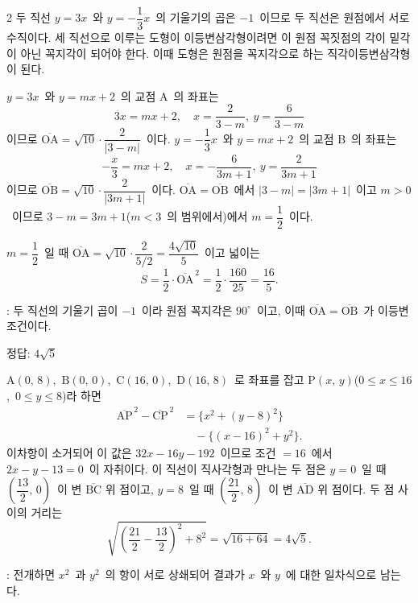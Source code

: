 \documentclass[10pt,fleqn]{article}
\begin{document}
\begin{multicols*}{2}
두 직선 $y = 3x$\ 와 $y = -\dfrac{1}{3}x$\ 의 기울기의 곱은 $-1$\ 이므로 두 직선은 원점에서 서로 수직이다. 세 직선으로 이루는 도형이 이등변삼각형이려면 이 원점 꼭짓점의 각이 밑각이 아닌 꼭지각이 되어야 한다. 이때 도형은 원점을 꼭지각으로 하는 직각이등변삼각형이 된다.

$y = 3x$\ 와 $y = mx + 2$\ 의 교점 $\mathrm{A}$\ 의 좌표는
\[ 3x = mx + 2,\quad x = \dfrac{2}{3 - m},\ y = \dfrac{6}{3 - m} \]
이므로 $\overline{\mathrm{OA}} = \sqrt{10} \cdot \dfrac{2}{|3 - m|}$\ 이다. $y = -\dfrac{1}{3}x$\ 와 $y = mx + 2$\ 의 교점 $\mathrm{B}$\ 의 좌표는
\[ -\dfrac{x}{3} = mx + 2,\quad x = -\dfrac{6}{3m + 1},\ y = \dfrac{2}{3m + 1} \]
이므로 $\overline{\mathrm{OB}} = \sqrt{10} \cdot \dfrac{2}{|3m + 1|}$\ 이다. $\overline{\mathrm{OA}} = \overline{\mathrm{OB}}$\ 에서 $|3 - m| = |3m + 1|$\ 이고 $m > 0$\ 이므로 $3 - m = 3m + 1$($m < 3$\ 의 범위에서)에서 $m = \dfrac{1}{2}$\ 이다.

$m = \dfrac{1}{2}$\ 일 때 $\overline{\mathrm{OA}} = \sqrt{10} \cdot \dfrac{2}{5/2} = \dfrac{4\sqrt{10}}{5}$\ 이고 넓이는
\[ S = \dfrac{1}{2} \cdot \overline{\mathrm{OA}}^{\,2} = \dfrac{1}{2} \cdot \dfrac{160}{25} = \dfrac{16}{5}. \]

\begin{dmcriticalpoint}
: 두 직선의 기울기 곱이 $-1$\ 이라 원점 꼭지각은 $90^{\circ}$\ 이고, 이때 $\overline{\mathrm{OA}} = \overline{\mathrm{OB}}$\ 가 이등변 조건이다.
\end{dmcriticalpoint}

\begin{dmanswerbox}
정답: $4\sqrt{5}$
\end{dmanswerbox}

$\mathrm{A}(0,\, 8)$,\ $\mathrm{B}(0,\, 0)$,\ $\mathrm{C}(16,\, 0)$,\ $\mathrm{D}(16,\, 8)$\ 로 좌표를 잡고 $\mathrm{P}(x,\, y)$($0 \le x \le 16$,\ $0 \le y \le 8$)라 하면
\begin{align*}
  \overline{\mathrm{AP}}^{\,2} - \overline{\mathrm{CP}}^{\,2} &= \{x^2 + (y-8)^2\}\\
  &\quad - \{(x-16)^2 + y^2\}.
\end{align*}
이차항이 소거되어 이 값은 $32x - 16y - 192$\ 이므로 조건 $= 16$\ 에서 $2x - y - 13 = 0$\ 이 자취이다. 이 직선이 직사각형과 만나는 두 점은 $y = 0$\ 일 때 $\left( \dfrac{13}{2},\, 0 \right)$\ 이 변 $\overline{\mathrm{BC}}$ 위 점이고, $y = 8$\ 일 때 $\left( \dfrac{21}{2},\, 8 \right)$\ 이 변 $\overline{\mathrm{AD}}$ 위 점이다. 두 점 사이의 거리는
\[ \sqrt{\left( \dfrac{21}{2} - \dfrac{13}{2} \right)^2 + 8^2} = \sqrt{16 + 64} = 4\sqrt{5}. \]

\begin{dmcriticalpoint}
: 전개하면 $x^2$\ 과 $y^2$\ 의 항이 서로 상쇄되어 결과가 $x$\ 와 $y$\ 에 대한 일차식으로 남는다.
\end{dmcriticalpoint}

\end{multicols*}
\end{document}
